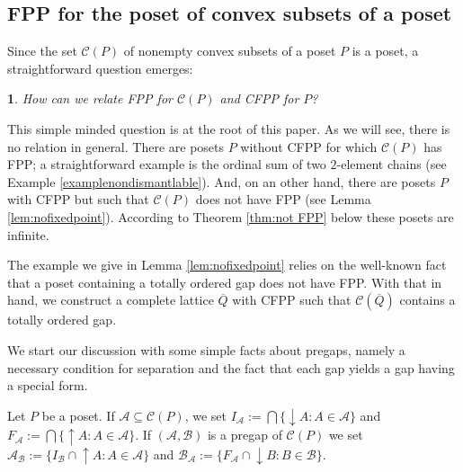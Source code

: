 \documentclass[12pt]{amsart}
\newtheorem{question}[definition]{\noindent {\bf Question}}
\begin{document}
\subsection{FPP for the poset of convex subsets of a poset}

Since the set $\mathcal C (P)$ of nonempty convex subsets of a
poset $P$ is a poset, a straightforward question emerges:

\begin{question}\label{question1b}
How can we relate  FPP for   $\mathcal C (P)$ and  CFPP for $P$?

\end{question}

This simple minded question is at the root of this paper. As we will
see, there is no relation in general. There are posets $P$ without
CFPP for which $\mathcal C (P)$ has FPP; a straightforward example is
the ordinal sum of two $2$-element chains (see Example
\ref{examplenondismantlable}). And, on an other hand, there are posets
$P$ with CFPP but such that $\mathcal C (P)$ does not have FPP (see
Lemma \ref{lem:nofixedpoint}). According to Theorem \ref{thm:not FPP}
below these posets are infinite.

The example we give in Lemma \ref {lem:nofixedpoint} relies on the
well-known fact that a poset containing a totally ordered gap does not
have FPP. With that in hand, we construct a complete lattice
$\overline Q$ with CFPP such that $\mathcal C (\overline Q)$
contains a totally ordered gap.

We start our discussion with some simple facts about pregaps, namely a
necessary condition for separation and the fact that each gap yields a
gap having a special form.

Let $P$ be a poset.  If $\mathcal A \subseteq \mathcal C (P)$, we
set $I_{\mathcal A}:= \bigcap\{{\downarrow \!\!} A: A\in \mathcal A\}$
and $F_{\mathcal A}:= \bigcap\{{\uparrow \!\!} A: A\in \mathcal A\}$. If
$(\mathcal A, \mathcal B)$ is a pregap of $\mathcal C (P)$ we set
$\mathcal A_{\mathcal B}:= \{ I_{\mathcal B}\cap {\uparrow \!\!} A: A\in
\mathcal A\}$ and $\mathcal B_{\mathcal A}:= \{F_{\mathcal A} \cap
{\downarrow \!\!} B : B\in \mathcal B\}$.
\end{document}
